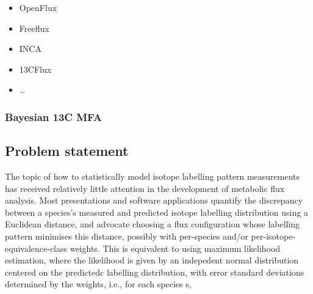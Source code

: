 \documentclass{article}
\def\tightlist{}
\begin{document}
\begin{itemize}
\tightlist
\item
  OpenFlux
\item
  Freeflux
\item
  INCA
\item
  13CFlux
\item
  \ldots{}
\end{itemize}

\subsubsection{Bayesian 13C MFA}\label{bayesian-13c-mfa}

\subsection{Problem statement}\label{problem-statement}

The topic of how to statistically model isotope labelling pattern
measurements has received relatively little attention in the development
of metabolic flux analysis. Most presentations and software applications
quantify the discrepancy between a species's measured and predicted
isotope labelling distribution using a Euclidean distance, and advocate
choosing a flux configuration whose labelling pattern minimises this
distance, possibly with per-species and/or per-isotope-equivalence-class
weights. This is equivalent to using maximum likelihood estimation,
where the likelihood is given by an indepedent normal distribution
centered on the predictedc labelling distribution, with error standard
deviations determined by the weights, i.e., for each species s,


\end{document}
